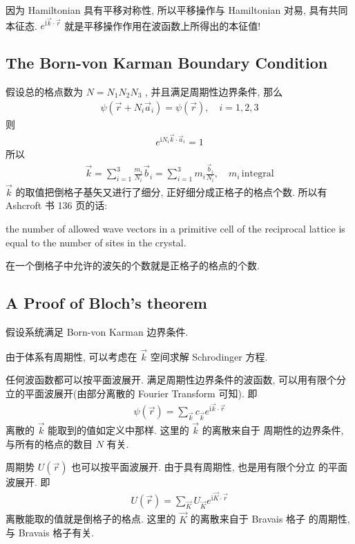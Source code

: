 \documentclass{ctexart}
\begin{document}
因为 Hamiltonian 具有平移对称性, 所以平移操作与 Hamiltonian 对易, 具有共同本征态.
$e^{\mathrm{i}\vec{k}\cdot \vec{r}}$ 就是平移操作作用在波函数上所得出的本征值!

\subsection{The Born-von Karman Boundary Condition}

假设总的格点数为 $N = N_1N_2N_3$ , 并且满足周期性边界条件, 那么
\begin{align*}
  \psi(\vec{r}+ N_i \vec{a}_i) = \psi(\vec{r}), \quad i = 1, 2, 3
\end{align*}
则
\begin{align*}
  e^{\mathrm{i} N_i \vec{k}\cdot \vec{a}_i} = 1
\end{align*}
所以
\begin{align*}
  \vec{k} = \sum_{i=1}^3 \frac{m_i}{N_i}\vec{b}_i =\sum_{i=1}^3 m_i\frac{\vec{b}_i}{N_i} , \quad m_i\, \mathrm{integral}
\end{align*}
$\vec{k}$ 的取值把倒格子基矢又进行了细分, 正好细分成正格子的格点个数. 所以有 Ashcroft 书 136 页的话:

the number of allowed wave vectors in a primitive cell of the reciprocal lattice is equal to
the number of sites in the crystal.

在一个倒格子中允许的波矢的个数就是正格子的格点的个数.

\subsection{A Proof of Bloch's theorem}

假设系统满足 Born-von Karman 边界条件.

由于体系有周期性, 可以考虑在 $\vec{k}$ 空间求解 Schrodinger 方程.

任何波函数都可以按平面波展开. 满足周期性边界条件的波函数,
可以用有限个分立的平面波展开(由部分离散的 Fourier Transform 可知). 即
\begin{align*}
  \psi(\vec{r}) = \sum_{\vec{k}} c_{\vec{k}} e^{\mathrm{i}\vec{k}\cdot \vec{r}}
\end{align*}
离散的 $\vec{k}$ 能取到的值如定义中那样. 这里的 $\vec{k}$ 的离散来自于
周期性的边界条件, 与所有的格点的数目 $N$ 有关.

周期势 $U(\vec{r})$ 也可以按平面波展开. 由于具有周期性, 也是用有限个分立
的平面波展开. 即
\begin{align*}
  U(\vec{r}) = \sum_{\vec{K}} U_{\vec{K}} e^{\mathrm{i} \vec{K}\cdot \vec{r}}
\end{align*}
离散能取的值就是倒格子的格点. 这里的 $\vec{K}$ 的离散来自于 Bravais 格子
的周期性, 与 Bravais 格子有关.
\end{document}
